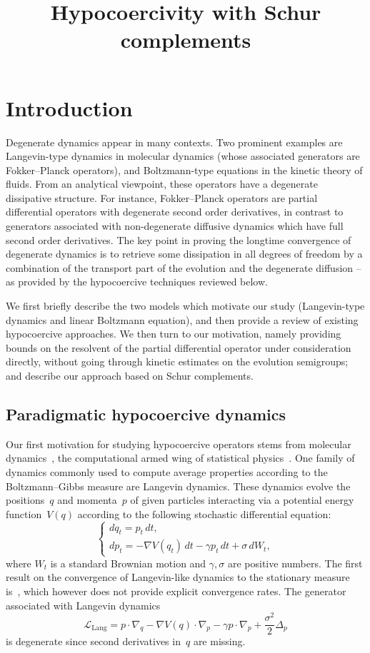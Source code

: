 \documentclass[AHL,Unicode,longabstracts,MathTools,published]{cedram}
\title[Hypocoercivity with Schur complements]{Hypocoercivity with Schur complements}
\author[\initial{E.} \lastname{Bernard}]{\firstname{\'Etienne} \lastname{Bernard}}
\author[\initial{M.} \lastname{Fathi}]{\firstname{Max} \lastname{Fathi}}
\author[\initial{A.} \lastname{Levitt}]{\firstname{Antoine} \lastname{Levitt}}
\author[\initial{G.} \lastname{Stoltz}]{\firstname{Gabriel} \lastname{Stoltz}}
\newcommand{\Lang}{\mathrm{Lang}}
\newcommand{\cL}{\mathcal{L}}
\begin{document}
\maketitle

\section{Introduction}

Degenerate dynamics appear in many contexts. Two prominent examples are Langevin-type dynamics in molecular dynamics (whose associated generators are Fokker--Planck operators), and Boltzmann-type equations in the kinetic theory of fluids. From an analytical viewpoint, these operators have a degenerate dissipative structure. For instance, Fokker--Planck operators are partial differential operators with degenerate second order derivatives, in contrast to generators associated with non-degenerate diffusive dynamics which have full second order derivatives. The key point in proving the longtime convergence of degenerate dynamics is to retrieve some dissipation in all degrees of freedom by a combination of the transport part of the evolution and the degenerate diffusion -- as provided by the hypocoercive techniques reviewed below.

We first briefly describe the two models which motivate our study (Langevin-type dynamics and linear Boltzmann equation), and then provide a review of existing hypocoercive approaches. We then turn to our motivation, namely providing bounds on the resolvent of the partial differential operator under consideration directly, without going through kinetic estimates on the evolution semigroups; and describe our approach based on Schur complements.

\subsection*{Paradigmatic hypocoercive dynamics}
Our first motivation for studying hypocoercive operators stems from molecular dynamics~\cite{FrenkelSmit,LM15,LS16,Tuckerman}, the computational armed wing of statistical physics~\cite{Balian}. One family of dynamics commonly used to compute average properties according to the Boltzmann--Gibbs measure are Langevin dynamics. These dynamics evolve the positions~$q$ and momenta~$p$ of given particles interacting via a potential energy function~$V(q)$ according to the following stochastic differential equation:
\[
\begin{cases}
dq_t  = p_t \, dt,\\
dp_t  = -\nabla V(q_t) \, dt - \gamma p_t \, dt + \sigma \, dW_t,
\end{cases}
\]
where $W_t$ is a standard Brownian motion and $\gamma,\sigma$ are positive numbers. The first result on the convergence of Langevin-like dynamics to the stationary measure is~\cite{Tropper77}, which however does not provide explicit convergence rates. The generator associated with Langevin dynamics
\[
\cL_{\Lang} = p \cdot \nabla_q - \nabla V(q) \cdot \nabla_p - \gamma p \cdot \nabla_p + \frac{\sigma^2}{2} \Delta_p
\]
is degenerate since second derivatives in~$q$ are missing.
\end{document}
